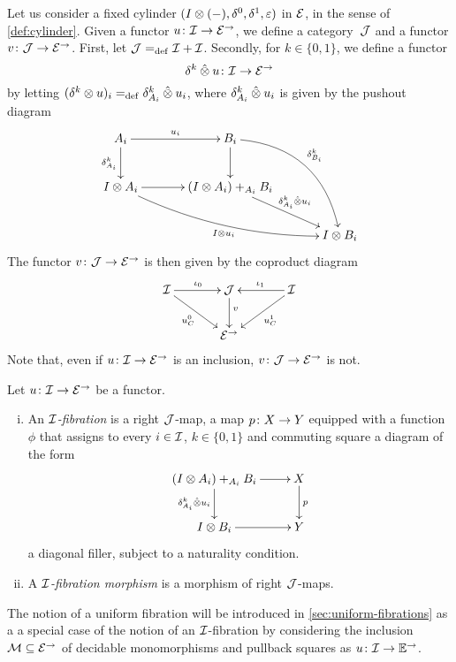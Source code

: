 \documentclass[reqno,10pt,a4paper,oneside]{amsart}
\begin{document}
Let us consider a fixed cylinder $(\interval \otimes (-), \lcyl, \rcyl, \ccyl)$ in $\catE$, in the sense of \cref{def:cylinder}. 
Given a functor $u \co \cal{I} \to \catE^\to$, we define a category~$\cal{J}$ and a functor $v \co \cal{J} \to \catE^\to$. 
First, let $\cal{J} \defeq \cal{I} + \cal{I}$. Secondly, for  $k \in \{ 0, 1 \}$, we define a functor
 \[
\kcyl \hatotimes u \co \cal{I} \to \catE^\to
 \]
 by letting $(\kcyl \otimes u)_i \defeq \kcyl_{A_i} \hatotimes u_i$,  where $\kcyl_{A_i} \hatotimes u_i$ is given by the pushout diagram
 \[
\xymatrix@C=1.2cm{
A_i \ar[r]^{u_i}  \ar[d]_{\kcyl_{A_i}} & B_i  \ar@/^2pc/[ddr]^{\kcyl_{B_i}} \ar[d] & \\ 
\interval \otimes A_i \ar@/_1pc/[drr]_{\interval \otimes u_i} \ar[r] & (\interval \otimes A_i) +_{A_i} B_i \ar[dr]^-{\delta^k_{A_i} \hatotimes u_i}  & \\ 
 & & \interval \otimes B_i} 
 \]
The functor $v  \co \cal{J}  \to \catE^\to$ is then given by the coproduct diagram
\begin{equation}
\label{equ:u-interval}
\vcenter{\hbox{\xymatrix@C=1.2cm{
\cal{I} \ar[r]^{\iota_0} \ar[dr]_-{u_\cyl^0} & \cal{J} \ar[d]^(.4){v} & \cal{I} \ar[dl]^-{u_\cyl^1} \ar[l]_{\iota_1} \\ 
 & \catE^\to }}}
\end{equation}
Note that, even if $u \co \cal{I} \to \catE^\to$ is an inclusion, $v \co \cal{J} \to \catE^\to$ is not.

\begin{definition} \label{def:I-fibration}
Let $u \co \cal{I} \to \catE^\to$ be a functor.
\begin{enumerate}[(i)]
\item An \emph{$\cal{I}$-fibration} is a right $\cal{J}$-map, \ie 
a map  $p \co X \to Y$ equipped with a function~$\phi$ that assigns
to every $i \in \cal{I}$, $k \in \{0, 1\}$  and commuting
square a diagram of the form
\[
\xymatrix{
(\interval \otimes A_i) +_{A_i} B_i  \ar[r] \ar[d]_{\kcyl_{A_i} \hatotimes u_i} & X \ar[d]^p \\
\interval \otimes B_i  \ar[r] & Y }
\]
a diagonal filler, subject to a naturality condition.
\item A \emph{$\cal{I}$-fibration morphism} is a morphism of right $\cal{J}$-maps.
\end{enumerate}
\end{definition}


The notion of a uniform fibration will be introduced in \cref{sec:uniform-fibrations} as a a 
special case of the notion of an $\cal{I}$-fibration by considering the inclusion 
$\cal{M} \subseteq \cal{E}^\to$ of decidable monomorphisms and pullback squares
as $u \co \cal{I} \to \cat{E}^\to$. 
\end{document}
